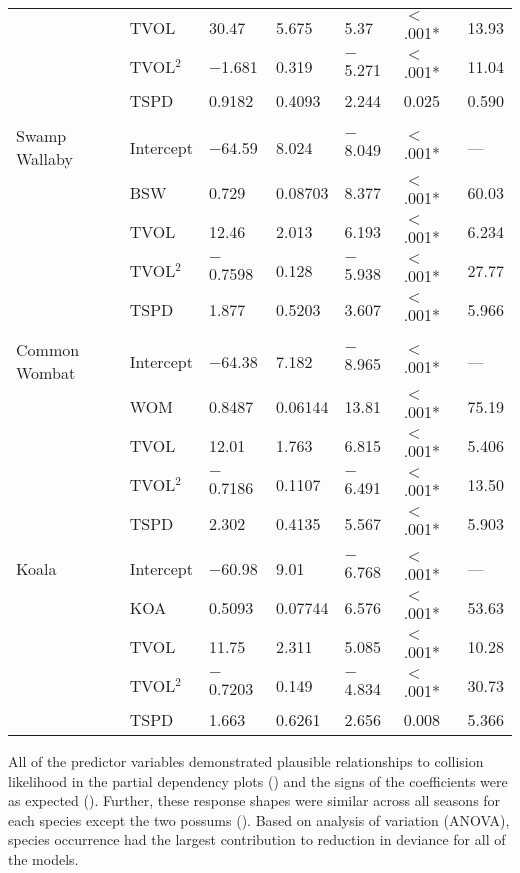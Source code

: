 \begin{table}[htp]
\begin{tabularx}{0.9\textwidth}{lllllll}
   & TVOL & 30.47 & 5.675 & 5.37 & $<$.001* & 13.93 \\ 
   & TVOL$^2$ & $-$1.681 & 0.319 & $-$5.271 & $<$.001* & 11.04 \\ 
   & TSPD & 0.9182 & 0.4093 & 2.244 & 0.025 & 0.590 \\ 
   &  &  &  &  &  &  \\ 
Swamp Wallaby & Intercept & $-$64.59 & 8.024 & $-$8.049 & $<$.001* & --- \\ 
   & BSW & 0.729 & 0.08703 & 8.377 & $<$.001* & 60.03 \\ 
   & TVOL & 12.46 & 2.013 & 6.193 & $<$.001* & 6.234 \\ 
   & TVOL$^2$ & $-$0.7598 & 0.128 & $-$5.938 & $<$.001* & 27.77 \\ 
   & TSPD & 1.877 & 0.5203 & 3.607 & $<$.001* & 5.966 \\ 
   &  &  &  &  &  &  \\ 
Common Wombat & Intercept & $-$64.38 & 7.182 & $-$8.965 & $<$.001* & --- \\ 
   & WOM & 0.8487 & 0.06144 & 13.81 & $<$.001* & 75.19 \\ 
   & TVOL & 12.01 & 1.763 & 6.815 & $<$.001* & 5.406 \\ 
   & TVOL$^2$ & $-$0.7186 & 0.1107 & $-$6.491 & $<$.001* & 13.50 \\ 
   & TSPD & 2.302 & 0.4135 & 5.567 & $<$.001* & 5.903 \\ 
   &  &  &  &  &  &  \\ 
Koala & Intercept & $-$60.98 & 9.01 & $-$6.768 & $<$.001* & --- \\ 
   & KOA & 0.5093 & 0.07744 & 6.576 & $<$.001* & 53.63 \\ 
   & TVOL & 11.75 & 2.311 & 5.085 & $<$.001* & 10.28 \\ 
   & TVOL$^2$ & $-$0.7203 & 0.149 & $-$4.834 & $<$.001* & 30.73 \\ 
   & TSPD & 1.663 & 0.6261 & 2.656 & 0.008 & 5.366 \\  
\bottomrule
\end{tabularx}
\label{6sp_sum_coll}
\end{table}

All of the predictor variables demonstrated plausible relationships to collision likelihood in the partial dependency plots () and the signs of the coefficients were as expected (). Further, these response shapes were similar across all seasons for each species except the two possums (). Based on analysis of variation (ANOVA), species occurrence had the largest contribution to reduction in deviance for all of the models.

